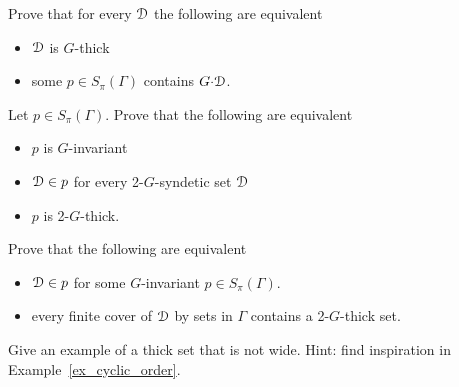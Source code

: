 \begin{exercise}
  Prove that for every $\EuScript D$ the following are equivalent
  \begin{itemize}
    \item[1.] $\EuScript D$ is $G$-thick
    \item[2.] some $p\in S_\pi(\Gamma)$ contains $G{\cdot}\EuScript D$.
  \end{itemize}
\end{exercise}

\begin{exercise}
  Let $p\in S_\pi(\Gamma)$.
  Prove that the following are equivalent
  \begin{itemize}
    \item[1.] $p$ is $G$-invariant
    \item[2.] $\EuScript D\in p$ for every 2-$G$-syndetic set $\EuScript D$
    \item[3.] $p$ is 2-$G$-thick.
  \end{itemize}
\end{exercise}

\begin{exercise}
  Prove that the following are equivalent 
  \begin{itemize}
    \item[1.] $\EuScript D\in p$ for some $G$-invariant $p\in S_\pi(\Gamma)$.
    \item[2.] every finite cover of $\EuScript D$ by sets in $\Gamma$ contains a 2-$G$-thick set.
  \end{itemize}
\end{exercise}



\begin{exercise}
  Give an example of a thick set that is not wide.
  Hint: find inspiration in Example~\ref{ex_cyclic_order}.
\end{exercise}

